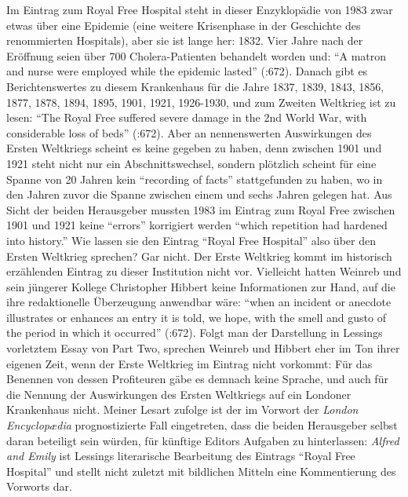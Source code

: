 \documentclass[fontsize=12pt]{scrartcl}
\begin{document}
Im Eintrag zum Royal Free Hospital steht in dieser Enzyklop\"adie von 1983 zwar etwas \"uber eine Epidemie (eine weitere Krisenphase in der Geschichte des renommierten Hospitals), aber sie ist lange her: 1832. \mbox{Vier} Jahre nach der Er\"offnung seien \"uber 700 Cholera-Patienten\textsuperscript{\tiny *} behandelt worden und: "`A matron and nurse were employed while the epidemic lasted"' (\cite{LondonEncyclopaedia1983}:672). Danach gibt es Be\-rich\-tenswertes zu diesem Krankenhaus f\"ur die Jahre 1837, 1839, 1843, 1856, 1877, 1878, 1894, 1895, 1901, 1921, 1926-1930, und zum Zwei\-ten Weltkrieg ist zu lesen: "`The Royal Free suffered severe damage in the 2nd World War, with considerable loss of beds"' (\cite{LondonEncyclopaedia1983}:672). Aber an nennenswerten Auswirkungen des Ersten Weltkriegs scheint es keine gegeben zu haben, denn zwischen 1901 und 1921 steht nicht nur ein Abschnittswechsel, sondern pl\"otzlich scheint f\"ur eine Spanne von 20 Jahren kein "`recording of facts"' stattgefunden zu haben, wo in den Jahren zuvor die Spanne zwischen einem und sechs Jahren gelegen hat. Aus Sicht der beiden He\-rausgeber mussten 1983 im Eintrag zum Royal Free zwischen 1901 und 1921 keine "`errors"' korrigiert werden "`which repetition had hardened into history."' Wie lassen sie den Eintrag "`Royal Free Hospital"' also \"uber den Ersten Weltkrieg sprechen? Gar nicht. Der Erste Weltkrieg kommt im historisch erz\"ahlenden Eintrag zu dieser Institution nicht vor. Vielleicht hatten Weinreb und sein j\"ungerer Kollege Christopher Hibbert keine Informationen zur Hand, auf die ihre redaktionelle \"Uberzeugung anwendbar w\"are: "`when an incident or anecdote illustrates or enhances an entry it is told, we hope, with the smell and gusto of the period in which it occurred"' (\cite{LondonEncyclopaedia1983}:672). Folgt man der Darstellung in Lessings vorletztem Essay von Part Two, sprechen Weinreb und Hibbert eher im Ton ihrer eigenen Zeit, wenn der Erste Weltkrieg im Eintrag nicht vorkommt: F\"ur das Benennen von dessen Profiteuren\textsuperscript{\tiny *} g\"abe es demnach keine Sprache, und auch f\"ur die Nennung der Auswirkungen des Ersten Weltkriegs auf ein Londoner Krankenhaus nicht. Meiner Lesart zufolge ist der im Vorwort der \textit{London Encyclop{\ae}dia} prognostizierte Fall eingetreten, dass die beiden He\-rausgeber\textsuperscript{\tiny *} \mbox{selbst} daran beteiligt sein w\"urden, f\"ur k\"unftige Editors\textsuperscript{\tiny *} Aufgaben zu hinterlassen: \textit{Alfred and Emily} ist Lessings li\-te\-ra\-rische Bearbeitung des Eintrags "`Royal Free Hospital"' und stellt nicht zu\-letzt mit bildlichen Mitteln eine Kommentierung des Vorworts dar. 
\end{document}

